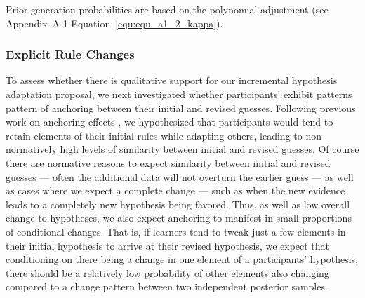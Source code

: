 \documentclass[doc,natbib,floatsintext]{apa7}
\newcommand\notesize{\fontsize{8pt}{9pt}\selectfont}
\begin{document}
\begin{table}[!th]
\begin{center} 
\small
\caption{Mean ($\pm SD$) log prior generation probability and fit (loglikelihood) for participants' guesses and posterior rule samples using $b$ = 5.} 
\label{sample-table} 
\end{center} 
\vspace{-.75cm}
{\notesize Prior generation probabilities are based on the polynomial adjustment (see Appendix~A-1 Equation~\ref{equ:equ_a1_2_kappa}).}
\end{table} 

\subsubsection{Explicit Rule Changes}
To assess whether there is qualitative support for our incremental hypothesis adaptation proposal, we next investigated whether participants' exhibit patterns pattern of anchoring between their initial and revised guesses. Following previous work on anchoring effects \citep{dasgupta2017hypotheses, bramley2017formalizing, lieder2018anchoring}, we hypothesized that participants would tend to retain elements of their initial rules while adapting others, leading to non-normatively high levels of similarity between initial and revised guesses. Of course there are normative reasons to expect similarity between initial and revised guesses --- often the additional data will not overturn the earlier guess --- as well as cases where we expect a complete change --- such as when the new evidence leads to a completely new hypothesis being favored. Thus, as well as low overall change to hypotheses, we also expect anchoring to manifest in small proportions of conditional changes. That is, if learners tend to tweak just a few elements in their initial hypothesis to arrive at their revised hypothesis, we expect that conditioning on there being a change in one element of a participants' hypothesis, there should be a relatively low probability of other elements also changing compared to a change pattern between two independent posterior samples. 
\end{document}
